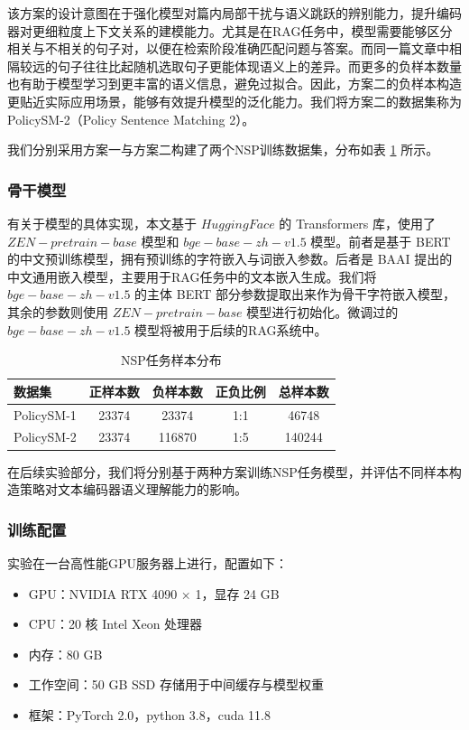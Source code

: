 \documentclass[12pt, a4paper]{ctexart}
\begin{document}
该方案的设计意图在于强化模型对篇内局部干扰与语义跳跃的辨别能力，提升编码器对更细粒度上下文关系的建模能力。尤其是在RAG任务中，模型需要能够区分相关与不相关的句子对，以便在检索阶段准确匹配问题与答案。而同一篇文章中相隔较远的句子往往比起随机选取句子更能体现语义上的差异。而更多的负样本数量也有助于模型学习到更丰富的语义信息，避免过拟合。因此，方案二的负样本构造更贴近实际应用场景，能够有效提升模型的泛化能力。我们将方案二的数据集称为PolicySM-2（Policy Sentence Matching 2）。

我们分别采用方案一与方案二构建了两个NSP训练数据集，分布如表 \ref{tab:nsp_samples} 所示。

\subsubsection{骨干模型}
有关于模型的具体实现，本文基于 $Hugging Face$ 的 Transformers 库，使用了 $ZEN-pretrain-base$ 模型和 $bge-base-zh-v1.5$ 模型。前者是基于 BERT 的中文预训练模型，拥有预训练的字符嵌入与词嵌入参数。后者是 BAAI 提出的中文通用嵌入模型，主要用于RAG任务中的文本嵌入生成。我们将 $bge-base-zh-v1.5$ 的主体 BERT 部分参数提取出来作为骨干字符嵌入模型，其余的参数则使用 $ZEN-pretrain-base$ 模型进行初始化。微调过的 $bge-base-zh-v1.5$ 模型将被用于后续的RAG系统中。

\begin{table}[H]
    \centering
    \begin{tabular}{lcccc}
        \toprule
        数据集 & 正样本数 & 负样本数 & 正负比例 & 总样本数 \\
        \midrule
        PolicySM-1 & 23374 & 23374 & 1:1 & 46748 \\
        PolicySM-2 & 23374 & 116870 & 1:5 & 140244 \\
        \bottomrule
    \end{tabular}
    \caption{NSP任务样本分布}
    \label{tab:nsp_samples}
\end{table}

在后续实验部分，我们将分别基于两种方案训练NSP任务模型，并评估不同样本构造策略对文本编码器语义理解能力的影响。

\subsubsection{训练配置}
实验在一台高性能GPU服务器上进行，配置如下：

\begin{itemize}
    \item GPU：NVIDIA RTX 4090 × 1，显存 24 GB
    \item CPU：20 核 Intel Xeon 处理器
    \item 内存：80 GB
    \item 工作空间：50 GB SSD 存储用于中间缓存与模型权重
    \item 框架：PyTorch 2.0，python 3.8，cuda 11.8
\end{itemize}
\end{document}
